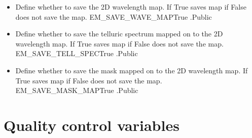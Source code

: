 \begin{itemize}
\item {} 
{Define whether to save the 2D wavelength map. If True saves map if False does not save the map.}
{EM\_SAVE\_WAVE\_MAP}{True}
{\calexometer}{\constantsfile}{\calexometer.\progMAIN}{Public}

\item {} 
{Define whether to save the telluric spectrum mapped on to the 2D wavelength map. If True saves map if False does not save the map.}
{EM\_SAVE\_TELL\_SPEC}{True}
{\calexometer}{\constantsfile}{\calexometer.\progMAIN}{Public}


\item {} 
{Define whether to save the mask mapped on to the 2D wavelength map. If True saves map if False does not save the map.}
{EM\_SAVE\_MASK\_MAP}{True}
{\calexometer}{\constantsfile}{\calexometer.\progMAIN}{Public}



\end{itemize}


\clearpage
\newpage
\section{Quality control variables}
\label{ch:variables:qualitycontrol}

